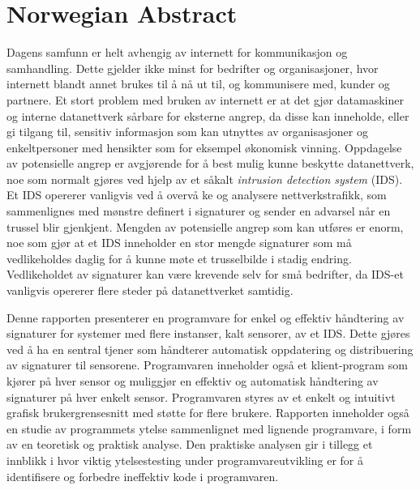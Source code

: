 \chapter*{Norwegian Abstract}

Dagens samfunn er helt avhengig av internett for kommunikasjon og samhandling.
Dette gjelder ikke minst for bedrifter og organisasjoner, hvor internett blandt
annet brukes til \aa{} n\aa{} ut til, og kommunisere med, kunder og partnere. Et
stort problem med bruken av internett er at det gj\o r datamaskiner og interne datanettverk s\aa rbare for eksterne angrep, da disse kan inneholde, eller gi
tilgang til, sensitiv informasjon som kan utnyttes av organisasjoner og
enkeltpersoner med hensikter som for eksempel \o konomisk vinning.
Oppdagelse av potensielle angrep er avgj\o rende for \aa{} best mulig kunne
beskytte datanettverk, noe som normalt gj\o res ved hjelp av et s\aa kalt {\em
intrusion detection system} (IDS). Et IDS opererer vanligvis ved \aa{} overv\aa
ke og analysere nettverkstrafikk, som sammenlignes med m\o nstre definert i
signaturer og sender en advarsel n\aa r en trussel blir gjenkjent.
Mengden av potensielle angrep som kan utf\o res er enorm, noe som gj\o r at et
IDS inneholder en stor mengde signaturer som m\aa{} vedlikeholdes daglig for
\aa{} kunne m\o te et trusselbilde i stadig endring. Vedlikeholdet av signaturer
kan v\ae re krevende selv for sm\aa{} bedrifter, da IDS-et vanligvis opererer
flere steder p\aa{} datanettverket samtidig.

Denne rapporten presenterer en programvare for enkel og effektiv h\aa ndtering
av signaturer for systemer med flere instanser, kalt sensorer, av et IDS. Dette
gj\o res ved \aa{} ha en sentral tjener som h\aa ndterer automatisk oppdatering
og distribuering av signaturer til sensorene. Programvaren inneholder ogs\aa{}
et klient-program som kj\o rer p\aa{} hver sensor og muliggj\o r en effektiv og
automatisk h\aa ndtering av signaturer p\aa{} hver enkelt sensor. Programvaren
styres av et enkelt og intuitivt grafisk brukergrensesnitt med st\o tte for
flere brukere. Rapporten inneholder ogs\aa{} en studie av programmets ytelse
sammenlignet med lignende programvare, i form av en teoretisk og praktisk
analyse. Den praktiske analysen gir i tillegg et innblikk i hvor viktig
ytelsestesting under programvareutvikling er for \aa{} identifisere og forbedre
ineffektiv kode i programvaren.
